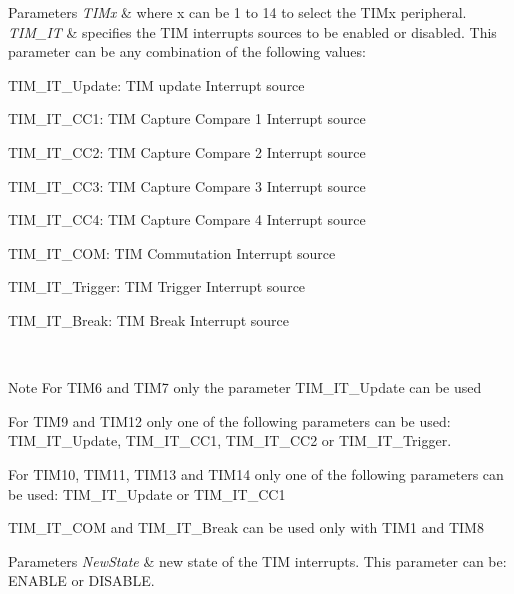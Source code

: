 \begin{DoxyParams}{Parameters}
{\em T\+I\+Mx} & where x can be 1 to 14 to select the T\+I\+Mx peripheral. \\
\hline
{\em T\+I\+M\+\_\+\+IT} & specifies the T\+IM interrupts sources to be enabled or disabled. This parameter can be any combination of the following values\+: \begin{DoxyItemize}
\item T\+I\+M\+\_\+\+I\+T\+\_\+\+Update\+: T\+IM update Interrupt source \item T\+I\+M\+\_\+\+I\+T\+\_\+\+C\+C1\+: T\+IM Capture Compare 1 Interrupt source \item T\+I\+M\+\_\+\+I\+T\+\_\+\+C\+C2\+: T\+IM Capture Compare 2 Interrupt source \item T\+I\+M\+\_\+\+I\+T\+\_\+\+C\+C3\+: T\+IM Capture Compare 3 Interrupt source \item T\+I\+M\+\_\+\+I\+T\+\_\+\+C\+C4\+: T\+IM Capture Compare 4 Interrupt source \item T\+I\+M\+\_\+\+I\+T\+\_\+\+C\+OM\+: T\+IM Commutation Interrupt source \item T\+I\+M\+\_\+\+I\+T\+\_\+\+Trigger\+: T\+IM Trigger Interrupt source \item T\+I\+M\+\_\+\+I\+T\+\_\+\+Break\+: T\+IM Break Interrupt source\end{DoxyItemize}
\\
\hline
\end{DoxyParams}
\begin{DoxyNote}{Note}
For T\+I\+M6 and T\+I\+M7 only the parameter T\+I\+M\+\_\+\+I\+T\+\_\+\+Update can be used 

For T\+I\+M9 and T\+I\+M12 only one of the following parameters can be used\+: T\+I\+M\+\_\+\+I\+T\+\_\+\+Update, T\+I\+M\+\_\+\+I\+T\+\_\+\+C\+C1, T\+I\+M\+\_\+\+I\+T\+\_\+\+C\+C2 or T\+I\+M\+\_\+\+I\+T\+\_\+\+Trigger. 

For T\+I\+M10, T\+I\+M11, T\+I\+M13 and T\+I\+M14 only one of the following parameters can be used\+: T\+I\+M\+\_\+\+I\+T\+\_\+\+Update or T\+I\+M\+\_\+\+I\+T\+\_\+\+C\+C1 

T\+I\+M\+\_\+\+I\+T\+\_\+\+C\+OM and T\+I\+M\+\_\+\+I\+T\+\_\+\+Break can be used only with T\+I\+M1 and T\+I\+M8
\end{DoxyNote}

\begin{DoxyParams}{Parameters}
{\em New\+State} & new state of the T\+IM interrupts. This parameter can be\+: E\+N\+A\+B\+LE or D\+I\+S\+A\+B\+LE. \\
\hline
\end{DoxyParams}

